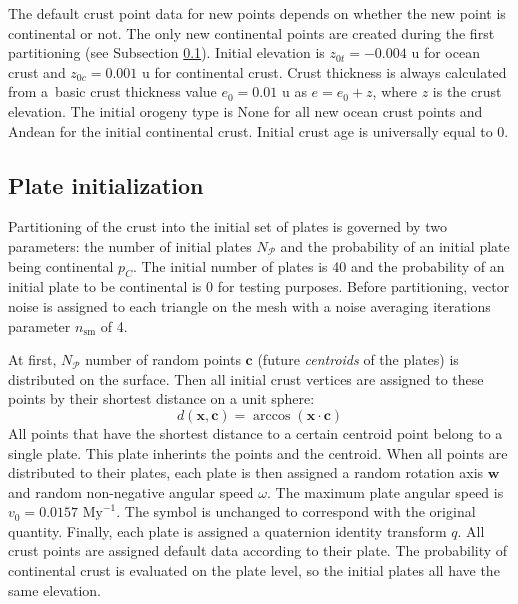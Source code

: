 The default crust point data for new points depends on whether the new point is continental or not. The only new continental points are created during the first partitioning (see Subsection \ref{subsec:plate-initialization}). Initial elevation is $z_{0t}=-0.004 \mbox{ u}$ for ocean crust and $z_{0c}=0.001 \mbox{ u}$ for continental crust. Crust thickness is always calculated from a~basic crust thickness value $e_0=0.01\mbox{ u}$ as $e=e_0+z$, where $z$ is the crust elevation. The initial orogeny type is None for all new ocean crust points and Andean for the initial continental crust. Initial crust age is universally equal to 0.
\subsection{Plate initialization}
\label{subsec:plate-initialization}
Partitioning of the crust into the initial set of plates  is governed by two parameters: the number of initial plates $N_\mathcal{P}$ and the probability of an initial plate being continental $p_C$. The initial number of plates is 40 and the probability of an initial plate to be continental is 0 for testing purposes. Before partitioning, vector noise is assigned to each triangle on the mesh with a noise averaging iterations parameter $n_{\mbox{sm}}$ of 4.

At first, $N_\mathcal{P}$ number of random points $\mathbf{c}$ (future \textit{centroids} of the plates) is distributed on the surface. Then all initial crust vertices are assigned to these points by their shortest distance on a unit sphere:
$$d(\mathbf{x},\mathbf{c})=\arccos(\mathbf{x}\cdot\mathbf{c})$$
All points that have the shortest distance to a certain centroid point belong to a single plate. This plate inherints the points and the centroid. When all points are distributed to their plates, each plate is then assigned a random rotation axis $\mathbf{w}$ and random non-negative angular speed $\omega$. The maximum plate angular speed is $v_0=0.0157\mbox{ My}^{-1}$. The symbol is unchanged to correspond with the original quantity. Finally, each plate is assigned a quaternion identity transform $q$. All crust points are assigned default data according to their plate. The probability of continental crust is evaluated on the plate level, so the initial plates all have the same elevation.

